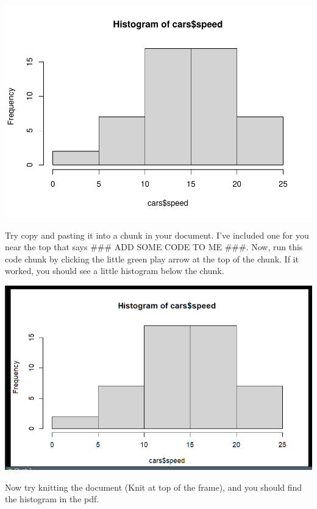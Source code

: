 \documentclass[
]{html}
\newenvironment{Shaded}{\begin{snugshade}}{\end{snugshade}}
\newcommand{\FunctionTok}[1]{\textcolor[rgb]{0.13,0.29,0.53}{\textbf{#1}}}
\newcommand{\NormalTok}[1]{#1}
\newcommand{\SpecialCharTok}[1]{\textcolor[rgb]{0.81,0.36,0.00}{\textbf{#1}}}
\theoremstyle{definition}
\theoremstyle{definition}
\theoremstyle{definition}
\theoremstyle{definition}
\theoremstyle{remark}
\begin{document}
\begin{Shaded}
\end{Shaded}

\includegraphics{_main_files/figure-latex/unnamed-chunk-6-1.pdf}

Try copy and pasting it into a chunk in your document. I've included one for you near the top that says \#\#\# ADD SOME CODE TO ME \#\#\#. Now, run this code chunk by clicking the little green play arrow at the top of the chunk. If it worked, you should see a little histogram below the chunk.

\includegraphics{images/clipboard-395323488.png}

Now try knitting the document (Knit at top of the frame), and you should find the histogram in the pdf.
\end{document}
